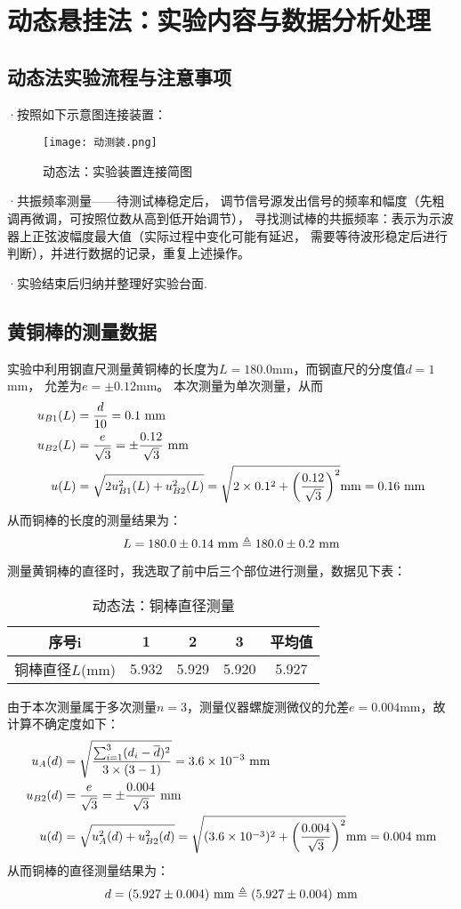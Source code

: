 \documentclass[11pt]{article}
\begin{document}
\section{动态悬挂法：实验内容与数据分析处理}

\subsection{动态法实验流程与注意事项}

·按照如下示意图连接装置：
\begin{figure}[H]
    \centering
    \texttt{[image: 动测装.png]}
    \caption{动态法：实验装置连接简图}
\end{figure}

·共振频率测量——待测试棒稳定后，
调节信号源发出信号的频率和幅度（先粗调再微调，可按照位数从高到低开始调节），
寻找测试棒的共振频率：表示为示波器上正弦波幅度最大值（实际过程中变化可能有延迟，
需要等待波形稳定后进行判断），并进行数据的记录，重复上述操作。

·实验结束后归纳并整理好实验台面.

\newpage
\subsection{黄铜棒的测量数据}

实验中利用钢直尺测量黄铜棒的长度为$L=180.0$mm，而钢直尺的分度值$d=1$mm，
允差为$e=\pm 0.12$mm。
本次测量为单次测量，从而
\begin{align*}
    u_{B1}(L)& =\frac{d}{10}=0.1  \,\,{\rm mm} \\
     u_{B2}(L)&=\frac{e}{\sqrt 3}=\pm \frac{0.12}{\sqrt 3} \,\,{\rm mm}\\
     u(L)&=\sqrt{2u_{B1}^2(L)+u^2_{B2}(L)} =\sqrt{2\times0.1^2+\left(\frac{0.12}{\sqrt3 }\right)^2}{\rm mm}=0.16 \,\,{\rm mm}
\end{align*}
从而铜棒的长度的测量结果为：
\[
   L=180.0\pm 0.14\,\,{\rm mm}\triangleq180.0\pm 0.2\,\,{\rm mm} 
\]

测量黄铜棒的直径时，我选取了前中后三个部位进行测量，数据见下表：
\begin{table}[H]
    \centering
    \begin{tabular}{ccccc}
        \toprule
        序号i&1&2&3&平均值\\
        \midrule
        铜棒直径$L$(mm) & 5.932 & 5.929 & 5.920 & 5.927 \\ 
        \bottomrule
    \end{tabular}
    \caption{动态法：铜棒直径测量}
\end{table}
由于本次测量属于多次测量$n=3$，测量仪器螺旋测微仪的允差$e=0.004$mm，故计算不确定度如下：
\begin{align*}
     u_A(d)&=\sqrt{\frac{\sum_{i=1}^3(d_i-\overline d)^2}{3\times(3-1)}}=3.6\times10^{-3}\,\,{\rm mm}\\
     u_{B2}(d)&=\frac{e}{\sqrt 3}=\pm \frac{0.004}{\sqrt 3} \,\,{\rm mm}\\
     u(d)&=
    \sqrt{u_{A}^2(d)+u^2_{B2}(d)} =\sqrt{(3.6\times10^{-3})^2+\left(\frac{0.004}{\sqrt3 }\right)^2}{\rm mm}
    =0.004 \,\,{\rm mm}
\end{align*}
从而铜棒的直径测量结果为：
\[
   d=(5.927\pm 0.004) \,\,{\rm mm}\triangleq (5.927\pm 0.004) \,\,{\rm mm}
\]
\end{document}
